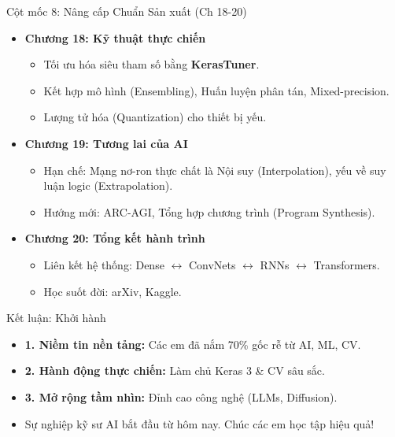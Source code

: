 \documentclass[aspectratio=169]{beamer}
\begin{document}
\begin{frame}{Cột mốc 8: Nâng cấp Chuẩn Sản xuất (Ch 18-20)}
    \begin{itemize}
        \item \textbf{Chương 18: Kỹ thuật thực chiến}
        \begin{itemize}
            \item Tối ưu hóa siêu tham số bằng \textbf{KerasTuner}.
            \item Kết hợp mô hình (Ensembling), Huấn luyện phân tán, Mixed-precision.
            \item Lượng tử hóa (Quantization) cho thiết bị yếu.
        \end{itemize}
        \item \textbf{Chương 19: Tương lai của AI}
        \begin{itemize}
            \item Hạn chế: Mạng nơ-ron thực chất là Nội suy (Interpolation), yếu về suy luận logic (Extrapolation).
            \item Hướng mới: ARC-AGI, Tổng hợp chương trình (Program Synthesis).
        \end{itemize}
        \item \textbf{Chương 20: Tổng kết hành trình}
        \begin{itemize}
            \item Liên kết hệ thống: Dense $\leftrightarrow$ ConvNets $\leftrightarrow$ RNNs $\leftrightarrow$ Transformers.
            \item Học suốt đời: arXiv, Kaggle.
        \end{itemize}
    \end{itemize}
\end{frame}

\begin{frame}{Kết luận: Khởi hành}
    \begin{itemize}
        \item \textbf{1. Niềm tin nền tảng:} Các em đã nắm 70\% gốc rễ từ AI, ML, CV.
        \item \textbf{2. Hành động thực chiến:} Làm chủ Keras 3 \& CV sâu sắc.
        \item \textbf{3. Mở rộng tầm nhìn:} Đỉnh cao công nghệ (LLMs, Diffusion).
        \item Sự nghiệp kỹ sư AI bắt đầu từ hôm nay. Chúc các em học tập hiệu quả!
    \end{itemize}
\end{frame}
\end{document}

